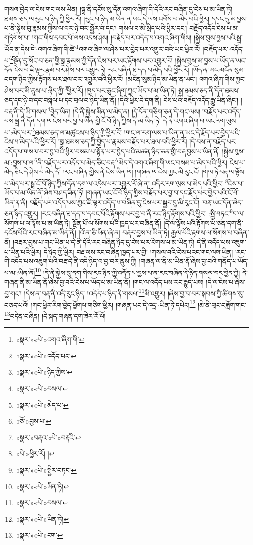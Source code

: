 གསལ་བྱེད་ལ་ངེས་གང་ལས་ཡིན། །སྒྲ་ནི་དངོས་སུ་དོན་འགའ་ཞིག་གི་དེའི་རང་བཞིན་དུ་ངེས་པ་མ་ཡིན་ཏེ། ཐམས་ཅད་ལ་རུང་བ་ཉིད་ཀྱི་ཕྱིར་རོ། །རུང་བ་ཉིད་མ་ཡིན་ན་ཡང་དེ་ལས་འཕོས་པ་མེད་པའི་ཕྱིར། དབང་དུ་མ་བྱས་པ་ནི་སྐྱེས་བུ་རྣམས་ཀྱིས་ལ་ལར་ཉེ་བར་སྦྱོར་བ་དང་། གསལ་བ་མི་སྲིད་པའི་ཕྱིར་དང་། བརྗོད་འདོད་ངེས་པ་མ་གཏོགས་པ། །གང་གིས་དབང་པོ་ལས་འདས་ཤེས། །བརྗོད་པར་འདོད་པ་འགའ་ཞིག་གིས། །སྐྱེས་བུས་བྱས་པའི་སྒྲ་ཡོད་ན་དེས་དེ་:འགའ་ཞིག་གི་ཚེ་\footnote{«སྣར་»«པེ་»འགའ་ཞིག་གི་}འགའ་ཞིག་ལ་ཤེས་པར་བྱེད་པར་འགྱུར་བའི་ཡང་ཕྱིར་རོ། །བརྗོད་པར་:འདོད་པ་\footnote{«སྣར་»«པེ་»འདོད་པར་}སྔོན་དུ་སོང་བ་ཅན་གྱི་སྒྲ་རྣམས་ཀྱི་དོན་ངེས་པར་ཡང་རྟོགས་པར་འགྱུར་རོ། །སྐྱེས་བུས་མ་བྱས་པ་ཡོད་ན་ཡང་དོན་ངེས་པ་ཇི་ལྟར་རྣམ་པར་ཤེས་པར་འགྱུར་ཏེ། རང་བཞིན་ཐ་དད་པ་མེད་པའི་ཕྱིར་རོ། །ཡོད་ན་ཡང་མངོན་སུམ་བདག་ཉིད་ཀྱིས་རྟོགས་པར་ཐལ་བར་འགྱུར་བའི་ཕྱིར་རོ། །མངོན་སུམ་ཉིད་མ་ཡིན་ན་ཡང་། འགའ་ཞིག་གིས་ཀྱང་ཤེས་པར་མི་ནུས་པ་:ཉིད་ཀྱི་\footnote{«སྣར་»«པེ་»ཉིད་ཀྱིས་}ཕྱིར་རོ། །ཁྱད་པར་ཅུང་ཞིག་ཀྱང་ཡོད་པ་མ་ཡིན་ཏེ། སྒྲ་ཐམས་ཅད་ནི་དོན་ཐམས་ཅད་དང་ཉེ་བ་དང་བསྐལ་པ་དང་བྲལ་བ་ཉིད་ཡིན་ནོ། །དེའི་ཕྱིར་དེ་དག་ནི། ངེས་པའི་བརྗོད་འདོད་རྒྱུ་ཡིན་ཞིང་། །བརྡ་ནི་དེ་ཡི་གསལ་\footnote{«སྣར་»«པེ་»བསལ་}བྱེད་ཡིན། །དེ་ནི་སྐྱེས་མིན་ལ་མེད་ན། །དེ་དོན་གཅིག་ཅན་དེ་གང་ལས། །བརྗོད་པར་འདོད་པས་སྒྲ་ནི་དོན་དག་ལ་ངེས་པར་བྱ་བ་ཡིན་གྱི་ངོ་བོ་ཉིད་ཀྱིས་ནི་མ་ཡིན་ཏེ། དེ་ནི་འགའ་ཞིག་ལ་ཡང་རག་ལུས་པ་:མེད་པར་\footnote{«སྣར་»«པེ་»མེད་པ་}ཐམས་ཅད་ལ་མཚུངས་པ་ཉིད་ཀྱི་ཕྱིར་རོ། །གང་ལ་རག་ལས་པ་ཡིན་ན་ཡང་དེ་རྗོད་པར་བྱེད་པའི་ངེས་པ་མེད་པའི་ཕྱིར་རོ། །སྒྲ་ཐམས་ཅད་ཀྱི་བྱེད་པ་རྣམས་བརྗོད་པར་ཐལ་བའི་ཕྱིར་རོ། །དེ་བས་ན་བརྗོད་པར་འདོད་པ་གསལ་བར་བྱ་བའི་ཕྱིར་བསམ་པ་སྟོན་པར་བྱེད་པའི་མཚན་ཉིད་ཅན་གྱི་བརྡ་བྱས་པ་ཡིན་ནོ། །སྐྱེས་བུས་མ་:བྱས་པ་ལ་\footnote{«ཅོ་»བྱས་པ་}ནི་བརྗོད་པར་འདོད་པ་མེད་ཅིང་བརྡ་\footnote{«སྣར་»བརྡའ་«པེ་»བརྡའི་}མེད་དེ་འགའ་ཞིག་གི་ཡང་བསམ་པ་མེད་པའི་ཕྱིར། ངེས་པ་མེད་ཅིང་དེ་ཤེས་པ་མེད་དོ། །རང་བཞིན་གྱིས་ནི་ངེས་ཡིན་ལ། །གཞན་ལ་ངེས་ཀྱང་མི་རུང་ངོ། །གལ་ཏེ་བརྡ་ལ་ལྟོས་པ་མེད་པར་སྒྲ་ངོ་བོ་ཉིད་ཀྱིས་དོན་དག་ལ་འདྲེས་པར་འགྱུར་རོ་ཞེ་ན། འདིར་རག་ལུས་པ་མེད་པའི་ཕྱིར། \footnote{«པེ་»ཕྱིར་རོ། ། }ངེས་པ་ཡོད་པ་མ་ཡིན་ནོ་ཞེས་བཤད་ཟིན་ཏོ། །གཞན་ཡང་ངོ་བོ་ཉིད་ཀྱིས་བརྗོད་པར་བྱ་བ་དང་རྗོད་པར་བྱེད་པའི་ངོ་བོ་ཡིན་ན་ནི། བརྗོད་པར་འདོད་པས་ཀྱང་ཇི་ལྟར་འདོད་པ་བཞིན་དུ་ངེས་པར་སྦྱར་དུ་མི་རུང་ངོ། །བརྡ་ཡང་དོན་མེད་ཅན་ཉིད་འགྱུར། །རང་བཞིན་ཐ་དད་པ་དབང་པོའི་རྟོགས་པར་བྱ་བ་ནི་རང་ཉིད་རྟོགས་པའི་ཕྱིར། :སྤྱི་བཏང་\footnote{«སྣར་»«པེ་»སྤྱིར་བཏང་}བ་ལ་སོགས་པ་ལ་ལྟོས་པ་མ་ཡིན་ཏེ། སྔོན་པོ་ལ་སོགས་པའི་ཁྱད་པར་བཞིན་ནོ། །དེ་ལ་ལྟོས་པའི་རྟོགས་པ་ཅན་དག་ནི་དངོས་པོའི་རང་བཞིན་མ་ཡིན་ནོ། །འོ་ན་ཅི་ཡིན་ཞེ་ན། བརྡར་བྱས་པ་ཡིན་ཏེ། རྒྱལ་པོའི་རྟགས་ལ་སོགས་པ་བཞིན་ནོ། །བརྡར་བྱས་པ་གང་ཡིན་པ་དེ་ནི་དེའི་རང་བཞིན་ཉིད་དུ་ངེས་པར་རིགས་པ་མ་ཡིན་ཏེ། དེ་ནི་འདོད་པས་འཇུག་པ་ཡིན་པའི་ཕྱིར། དེ་ཉིད་ཀྱི་ཕྱིར། བརྡ་ལས་རང་བཞིན་ཁྱད་པར་གྱི། །གསལ་བའི་ངེས་པའང་གང་ལས་ཡིན། །རང་གི་འདོད་པས་འཇུག་པའི་བརྡ་དེ་ནི་འདི་ཉིད་ལ་བྱ་བར་ནུས་ཀྱི། །གཞན་ལ་ནི་མ་ཡིན་ནོ་ཞེས་བྱ་བའི་གནོད་པ་ཡོད་པ་མ་:ཡིན་ནོ།\footnote{«སྣར་»«པེ་»ཡིན་ཏེ།} །དེ་ནི་སྐྱེས་བུ་དག་གིས་རང་ཉིད་ཀྱི་འདོད་པ་བྱས་པ་ན་རང་བཞིན་དེ་ཉིད་གསལ་བར་བྱེད་ཀྱི། དེ་གཞན་ནི་མ་ཡིན་ནོ་ཞེས་བྱ་བའི་ངེས་པ་ཡོད་པ་མ་ཡིན་ནོ། །གང་ལ་འདོད་པས་རང་རྒྱུད་པས། །དེ་ལ་ངེས་པ་ཞེས་བྱ་གང་། །དེས་ན་བརྡ་ནི་འདི་རུང་ཉིད། །འདོད་པ་ཉིད་ནི་གསལ་\footnote{«སྣར་»«པེ་»བསལ་}མི་འགྱུར། །ཞེས་བྱ་བ་བར་སྐབས་ཀྱི་ཚིགས་སུ་བཅད་པའོ། །གང་ཕྱིར་རིག་བྱེད་ཕྱོགས་གཅིག་ཕྱིར། །གཞན་ཡང་དེ་འདྲ་:ཡིན་ཏེ་དཔེར།\footnote{«སྣར་»«པེ་»ཡིན་ཏེ།} །མེ་ནི་གྲང་བཟློག་གང་\footnote{«སྣར་»«པེ་»ངག་}བདེན་བཞིན། །དེ་སྐད་གཞན་དག་ཟེར་རོ་ལོ། 